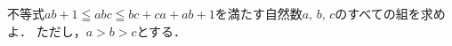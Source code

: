 \documentclass[../../main.tex]{subfiles}
\begin{document}
不等式$ab+1 \leqq abc \leqq bc+ca+ab+1$を満たす自然数$a, \, b, \, c$のすべての組を求めよ．
ただし，$a>b>c$とする．
\end{document}
